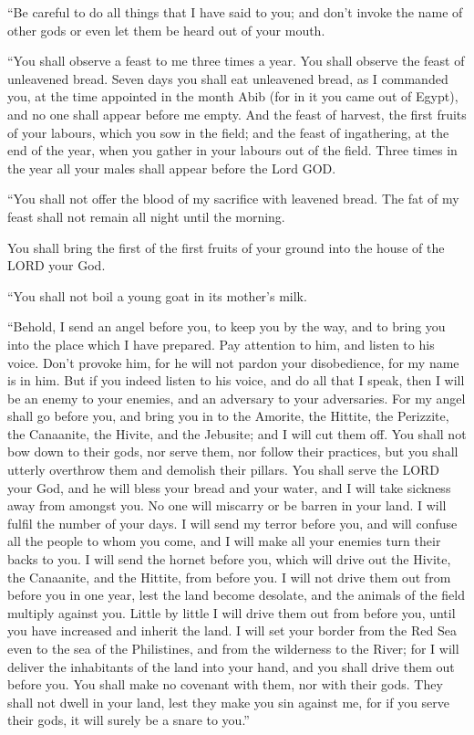  ``Be careful to do all things that I have said to you; and
don't invoke the name of other gods or even let them be heard out of
your mouth.

 ``You shall observe a feast to me three times a year.
 You shall observe the feast of unleavened bread. Seven
days you shall eat unleavened bread, as I commanded you, at the time
appointed in the month Abib (for in it you came out of Egypt), and no
one shall appear before me empty.  And the feast of
harvest, the first fruits of your labours, which you sow in the field;
and the feast of ingathering, at the end of the year, when you gather in
your labours out of the field.  Three times in the year all
your males shall appear before the Lord GOD.

 ``You shall not offer the blood of my sacrifice with
leavened bread. The fat of my feast shall not remain all night until the
morning.

 You shall bring the first of the first fruits of your
ground into the house of the LORD your God.

``You shall not boil a young goat in its mother's milk.

 ``Behold, I send an angel before you, to keep you by the
way, and to bring you into the place which I have prepared.
 Pay attention to him, and listen to his voice. Don't
provoke him, for he will not pardon your disobedience, for my name is in
him.  But if you indeed listen to his voice, and do all
that I speak, then I will be an enemy to your enemies, and an adversary
to your adversaries.  For my angel shall go before you, and
bring you in to the Amorite, the Hittite, the Perizzite, the Canaanite,
the Hivite, and the Jebusite; and I will cut them off.  You
shall not bow down to their gods, nor serve them, nor follow their
practices, but you shall utterly overthrow them and demolish their
pillars.  You shall serve the LORD your God, and he will
bless your bread and your water, and I will take sickness away from
amongst you.  No one will miscarry or be barren in your
land. I will fulfil the number of your days.  I will send
my terror before you, and will confuse all the people to whom you come,
and I will make all your enemies turn their backs to you. 
I will send the hornet before you, which will drive out the Hivite, the
Canaanite, and the Hittite, from before you.  I will not
drive them out from before you in one year, lest the land become
desolate, and the animals of the field multiply against you.
 Little by little I will drive them out from before you,
until you have increased and inherit the land.  I will set
your border from the Red Sea even to the sea of the Philistines, and
from the wilderness to the River; for I will deliver the inhabitants of
the land into your hand, and you shall drive them out before you.
 You shall make no covenant with them, nor with their gods.
 They shall not dwell in your land, lest they make you sin
against me, for if you serve their gods, it will surely be a snare to
you.''

